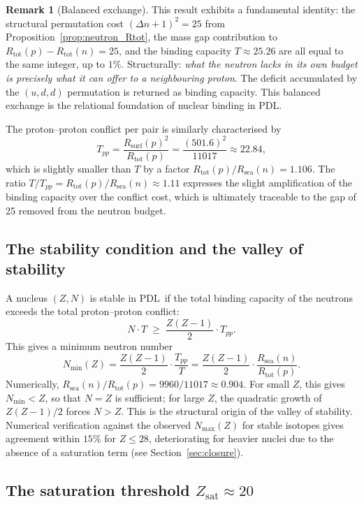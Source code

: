 \documentclass[11pt,a4paper]{article}
\theoremstyle{definition}
\newtheorem{remark}[theorem]{Remark}
\newcommand{\PDL}{\textnormal{PDL}}
\newcommand{\Rsurf}{R_{\mathrm{surf}}}
\newcommand{\Rsea}{R_{\mathrm{sea}}}
\newcommand{\Rtot}{R_{\mathrm{tot}}}
\newcommand{\Zsat}{Z_{\mathrm{sat}}}
\newcommand{\Tpp}{T_{pp}}
\begin{document}
\begin{remark}[Balanced exchange]
This result exhibits a fundamental identity: the structural permutation cost $(\Delta n + 1)^2 = 25$ from Proposition~\ref{prop:neutron_Rtot}, the mass gap contribution to $\Rtot(p) - \Rtot(n) = 25$, and the binding capacity $T \approx 25.26$ are all equal to the same integer, up to $1\%$. Structurally: \emph{what the neutron lacks in its own budget is precisely what it can offer to a neighbouring proton}. The deficit accumulated by the $(u,d,d)$ permutation is returned as binding capacity. This balanced exchange is the relational foundation of nuclear binding in \PDL.
\end{remark}

The proton--proton conflict per pair is similarly characterised by
\[
\Tpp = \frac{\Rsurf(p)^2}{\Rtot(p)} = \frac{(501.6)^2}{11017} \approx 22.84,
\]
which is slightly smaller than $T$ by a factor $\Rtot(p)/\Rsea(n) = 1.106$. The ratio $T/\Tpp = \Rtot(p)/\Rsea(n) \approx 1.11$ expresses the slight amplification of the binding capacity over the conflict cost, which is ultimately traceable to the gap of 25 removed from the neutron budget.

\subsection{The stability condition and the valley of stability}
\label{subsec:stability_condition}

A nucleus $(Z,N)$ is stable in \PDL\ if the total binding capacity of the neutrons exceeds the total proton--proton conflict:
\[
N \cdot T \;\geq\; \frac{Z(Z-1)}{2} \cdot \Tpp.
\]
This gives a minimum neutron number
\[
N_{\min}(Z) = \frac{Z(Z-1)}{2} \cdot \frac{\Tpp}{T} = \frac{Z(Z-1)}{2} \cdot \frac{\Rsea(n)}{\Rtot(p)}.
\]
Numerically, $\Rsea(n)/\Rtot(p) = 9960/11017 \approx 0.904$. For small $Z$, this gives $N_{\min} < Z$, so that $N = Z$ is sufficient; for large $Z$, the quadratic growth of $Z(Z-1)/2$ forces $N > Z$. This is the structural origin of the valley of stability. Numerical verification against the observed $N_{\max}(Z)$ for stable isotopes gives agreement within $15\%$ for $Z \leq 28$, deteriorating for heavier nuclei due to the absence of a saturation term (see Section~\ref{sec:closure}).

\subsection{The saturation threshold \texorpdfstring{$\Zsat \approx 20$}{Zsat ~ 20}}
\label{subsec:Zsat}
\end{document}
